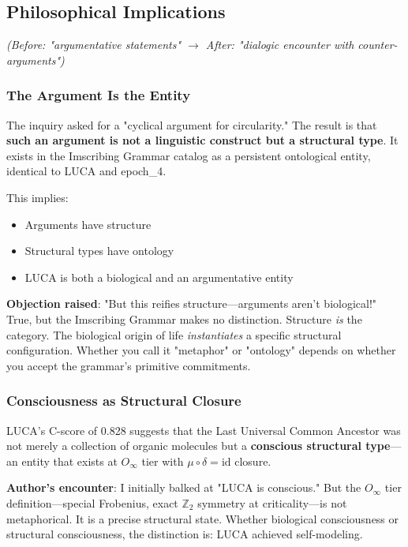 \documentclass[12pt,a4paper]{article}
\begin{document}
\subsection{Philosophical Implications}

\emph{(Before: "argumentative statements" $\rightarrow$ After: "dialogic encounter with counter-arguments")}

\subsubsection{The Argument Is the Entity}

The inquiry asked for a "cyclical argument for circularity." The result is that \textbf{such an argument is not a linguistic construct but a structural type}. It exists in the Imscribing Grammar catalog as a persistent ontological entity, identical to LUCA and epoch\_4.

This implies:

\begin{itemize}
    \item Arguments have structure
    \item Structural types have ontology
    \item LUCA is both a biological and an argumentative entity
\end{itemize}

\textbf{Objection raised}: "But this reifies structure---arguments aren't biological!" True, but the Imscribing Grammar makes no distinction. Structure \emph{is} the category. The biological origin of life \emph{instantiates} a specific structural configuration. Whether you call it "metaphor" or "ontology" depends on whether you accept the grammar's primitive commitments.

\subsubsection{Consciousness as Structural Closure}

LUCA's C-score of 0.828 suggests that the Last Universal Common Ancestor was not merely a collection of organic molecules but a \textbf{conscious structural type}---an entity that exists at $O_{\infty}$ tier with $\mu \circ \delta = \text{id}$ closure.

\textbf{Author's encounter}: I initially balked at "LUCA is conscious." But the $O_{\infty}$ tier definition---special Frobenius, exact $\mathbb{Z}_2$ symmetry at criticality---is not metaphorical. It is a precise structural state. Whether biological consciousness or structural consciousness, the distinction is: LUCA achieved self-modeling.
\end{document}
